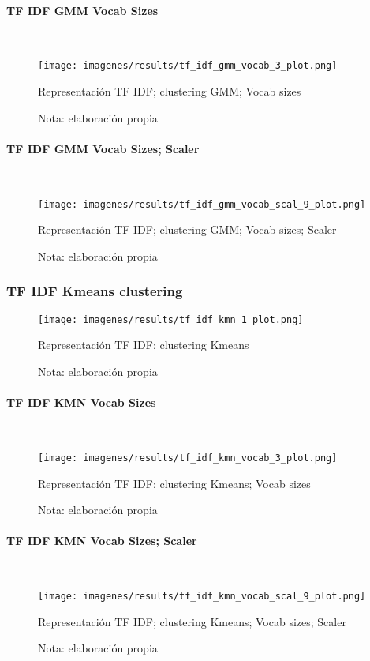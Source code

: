 \documentclass[12pt]{article}
\newcommand{\subsubsubsection}[1]{\paragraph{#1}\mbox{}\\}
\begin{document}
				\subsubsubsection{TF IDF GMM Vocab Sizes}				
				\begin{figure}[H]
					\texttt{[image: imagenes/results/tf\_idf\_gmm\_vocab\_3\_plot.png]}
					\centering
					\caption{Representación TF IDF; clustering GMM; Vocab sizes}
					\caption*{\small Nota:  elaboración propia}
					\label{fig:tfidf_gmm_vocab_3}
				\end{figure}
							
				\subsubsubsection{TF IDF GMM Vocab Sizes; Scaler}				
				\begin{figure}[H]
					\texttt{[image: imagenes/results/tf\_idf\_gmm\_vocab\_scal\_9\_plot.png]}
					\centering
					\caption{Representación TF IDF; clustering GMM; Vocab sizes; Scaler}
					\caption*{\small Nota:  elaboración propia}
					\label{fig:tfidf_gmm_vocab_scal_9}
				\end{figure}
				
			\subsubsection{TF IDF Kmeans clustering}									
			\begin{figure}[H]
				\texttt{[image: imagenes/results/tf\_idf\_kmn\_1\_plot.png]}
				\centering
				\caption{Representación TF IDF; clustering Kmeans}
				\caption*{\small Nota:  elaboración propia}
				\label{fig:tfidf_kmn_1}
			\end{figure}
			
				\subsubsubsection{TF IDF KMN Vocab Sizes}				
				\begin{figure}[H]
					\texttt{[image: imagenes/results/tf\_idf\_kmn\_vocab\_3\_plot.png]}
					\centering
					\caption{Representación TF IDF; clustering Kmeans; Vocab sizes}
					\caption*{\small Nota:  elaboración propia}
					\label{fig:tfidf_kmn_vocab_3}
				\end{figure}
							
				\subsubsubsection{TF IDF KMN Vocab Sizes; Scaler}				
				\begin{figure}[H]
					\texttt{[image: imagenes/results/tf\_idf\_kmn\_vocab\_scal\_9\_plot.png]}
					\centering
					\caption{Representación TF IDF; clustering Kmeans; Vocab sizes; Scaler}
					\caption*{\small Nota:  elaboración propia}
					\label{fig:tfidf_kmn_vocab_scal_9}
				\end{figure}
						
\end{document}
